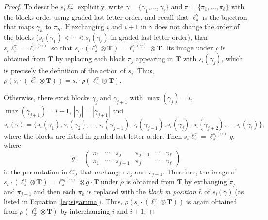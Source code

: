 \begin{proof}
To describe $s_i \ell_\pi^\gamma$ explicitly, write
$\gamma = \{\gamma_1, \ldots, \gamma_\ell\}$ and $\pi = \{\pi_1, \ldots, \pi_\ell\}$
with the blocks order using graded last letter order,
and recall that $\ell_\pi^\gamma$ is the bijection that maps $\gamma_h$ to $\pi_h$.
If exchanging $i$ and $i+1$ in $\gamma$ does not change the order of the
blocks (\ie $s_i(\gamma_1) < \cdots < s_i(\gamma_\ell)$ in
graded last letter order), then $s_i \ell_\pi^\gamma = \ell_\pi^{s_i(\gamma)}$
so that $s_i \cdot (\ell_\pi^\gamma \otimes \mathbf{T})
= \ell_\pi^{s_i(\gamma)} \otimes \mathbf{T}$.
Its image under $\rho$ is obtained from $\mathbf{T}$ by replacing each block
$\pi_j$ appearing in $\mathbf{T}$ with $s_i(\gamma_j)$,
which is precisely the definition of the action of $s_i$.
Thus, $\rho(s_i \cdot (\ell_\pi^\gamma \otimes \mathbf{T})) = s_i \cdot \rho(\ell_\pi^\gamma \otimes \mathbf{T})$.

Otherwise, there exist blocks $\gamma_{j}$ and $\gamma_{j+1}$ with
$\max(\gamma_{j}) = i$, $\max(\gamma_{j+1}) = i+1$,
$|\gamma_j| = |\gamma_{j+1}|$ and
\begin{equation} \label{eq:sigamma}
    s_i(\gamma) = \big\{
        s_i(\gamma_1), s_i(\gamma_2), \ldots,
        s_i(\gamma_{j-1}), s_i(\gamma_{j+1}), s_i(\gamma_{j}), s_i(\gamma_{j+2}), \ldots, s_i(\gamma_\ell)
        \big\},
\end{equation}
where the blocks are listed in graded last letter order.
Then $s_i \ell_\pi^\gamma = \ell_\pi^{s_i(\gamma)} g$, where
\[
g = \begin{pmatrix} \pi_1&\cdots&\pi_j&\pi_{j+1}&\cdots&\pi_{\ell}\\
\pi_1&\cdots&\pi_{j+1}&\pi_j&\cdots&\pi_{\ell}\end{pmatrix}
\]
is the permutation in $G_\lambda$ that exchanges $\pi_{j}$ and $\pi_{j+1}$.
Therefore, the image of
$s_i \cdot (\ell_\pi^\gamma \otimes \mathbf{T}) = \ell_\pi^{s_i(\gamma)} \otimes g \cdot \mathbf{T}$
under $\rho$ is obtained from $\mathbf{T}$ by exchanging $\pi_j$ and $\pi_{j+1}$
and then each $\pi_{h}$ is replaced with the \emph{block in position} $h$ of $s_i(\gamma)$
(as listed in Equation~\eqref{eq:sigamma}).
Thus, $\rho(s_i \cdot (\ell_\pi^\gamma \otimes \mathbf{T}))$ is
again obtained from $\rho(\ell_\pi^\gamma \otimes \mathbf{T})$
by interchanging $i$ and $i+1$.
\end{proof}

